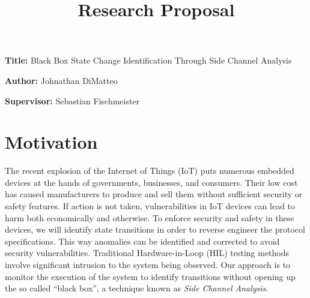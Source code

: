 \documentclass[11pt, a4paper]{article}
\title{Research Proposal}
\author{}
\date{}
\newcommand{\namelistlabel}[1]{\mbox{#1}\hfil}
\newenvironment{namelist}[1]{%
\begin{list}{}
    {
        \let\makelabel\namelistlabel
        \settowidth{\labelwidth}{#1}
        \setlength{\leftmargin}{1.1\labelwidth}
    }
  }{%
\end{list}}
\begin{document}
\maketitle

\begin{namelist}{xxxxxxxxxxxx}
\item[{\bf Title:}]
	Black Box State Change Identification Through Side Channel Analysis
\item[{\bf Author:}]
	Johnathan DiMatteo
\item[{\bf Supervisor:}]
	Sebastian Fischmeister
\end{namelist}

\section*{Motivation} 


The recent explosion of the Internet of Things (IoT) puts numerous embedded devices at the hands of governments, businesses, and consumers.
Their low cost has caused manufacturers to produce and sell them without sufficient security or safety features.
If action is not taken, vulnerabilities in IoT devices can lead to harm both economically and otherwise.
To enforce security and safety in these devices, we will identify state transitions in order to reverse engineer the protocol specifications.
This way anomalies can be identified and corrected to avoid security vulnerabilities.
Traditional Hardware-in-Loop (HIL) testing methods involve significant intrusion to the system being observed.
Our approach is to monitor the execution of the system to identify transitions without opening up the so called ``black box'', a technique known as \textit{Side Channel Analysis}. 

\end{document}
